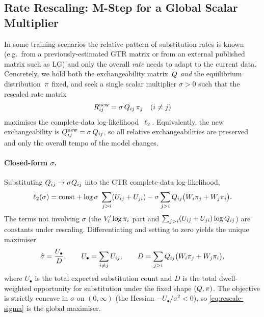 \subsection{Rate Rescaling: M-Step for a Global Scalar Multiplier}
\label{sec:mstep-rescaling}

In some training scenarios the relative pattern of substitution rates
is known (e.g.\ from a previously-estimated GTR matrix or from an
external published matrix such as LG) and only the overall \emph{rate}
needs to adapt to the current data.  Concretely, we hold both the
exchangeability matrix~$Q$ \emph{and} the equilibrium
distribution~$\pi$ fixed, and seek a single scalar multiplier
$\sigma > 0$ such that the rescaled rate matrix
\begin{equation}\label{eq:rescale-Q}
R^{\mathrm{new}}_{ij} = \sigma\,Q_{ij}\,\pi_j
\quad (i \neq j)
\end{equation}
maximises the complete-data log-likelihood~$\ell_2$.
Equivalently, the new exchangeability is
$Q^{\mathrm{new}}_{ij} = \sigma\,Q_{ij}$,
so all relative exchangeabilities are preserved and only the overall
tempo of the model changes.

\paragraph{Closed-form $\sigma$.}
Substituting $Q_{ij} \to \sigma Q_{ij}$ into the
GTR complete-data log-likelihood,
\[
\ell_2(\sigma) = \mathrm{const}
  + \log\sigma\;\sum_{j>i}(U_{ij} + U_{ji})
  - \sigma \sum_{j>i}Q_{ij}\bigl(W_i\pi_j + W_j\pi_i\bigr).
\]
The terms not involving $\sigma$ (the $V'_i\log\pi_i$ part and
$\sum_{j>i}(U_{ij}+U_{ji})\log Q_{ij}$) are constants under
rescaling.  Differentiating and setting to zero yields the unique
maximiser
\begin{equation}\label{eq:rescale-sigma}
\hat\sigma = \frac{U_\bullet}{D},
\qquad
U_\bullet = \sum_{i\neq j} U_{ij},
\qquad
D = \sum_{j>i}Q_{ij}\bigl(W_i\pi_j + W_j\pi_i\bigr),
\end{equation}
where $U_\bullet$ is the total expected substitution count and $D$ is
the total dwell-weighted opportunity for substitution under the fixed
shape $(Q, \pi)$.  The objective is strictly concave in $\sigma$
on $(0, \infty)$ (the Hessian $-U_\bullet/\sigma^2 < 0$), so
\eqref{eq:rescale-sigma} is the global maximiser.

